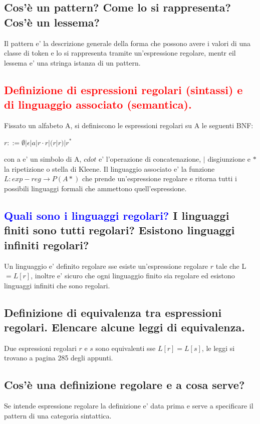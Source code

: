 \documentclass{article}
\begin{document}
\subsection{Cos'è un pattern? Come lo si rappresenta? Cos'è un lessema?}
Il pattern e' la descrizione generale della forma che possono avere i valori di
una classe di token e lo si rappresenta tramite un'espressione regolare, mentr
eil lessema e' una stringa istanza di un pattern.
\subsection{\textcolor{red}{Definizione di espressioni regolari (sintassi) e di linguaggio associato (semantica).}}
Fissato un alfabeto A, si definiscono le espressioni regolari su A le seguenti BNF:
\begin{center} $r::= \emptyset | \epsilon | a | r \cdot r | (r|r) | r^*$ \end{center}
con a e' un simbolo di A, $cdot$ e' l'operazione di concatenazione, $|$ disgiunzione e $*$ la ripetizione o stella di Kleene.
Il linguaggio associato e' la funzione $L: exp-reg \to P(A*)$ che prende un'espressione regolare e ritorna tutti i possibili linguaggi formali che ammettono quell'espressione.

\subsection{\textcolor{blue}{Quali sono i linguaggi regolari?} I linguaggi finiti sono tutti regolari? Esistono linguaggi infiniti regolari?}
Un linguaggio e' definito regolare sse esiste un'espressione regolare $r$ tale che L$=L[r]$, inoltre e' sicuro che ogni linguaggio finito sia regolare ed esistono linguaggi infiniti che sono regolari.
\subsection{Definizione di equivalenza tra espressioni regolari. Elencare alcune leggi di equivalenza.}
Due espressioni regolari $r$ e $s$ sono equivalenti sse $L[r] = L[s]$, le leggi
si trovano a pagina 285 degli appunti.
\subsection{Cos'è una definizione regolare e a cosa serve?}
Se intende espressione regolare la definizione e' data prima e serve a
specificare il pattern di una categoria sintattica.
\end{document}
